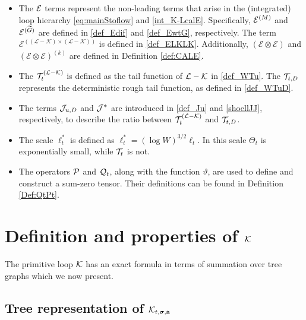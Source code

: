 \documentclass[10pt,reqno]{article}
\theoremstyle{plain} %
\theoremstyle{remark}
\numberwithin{equation}{section}
\begin{document}
\begin{itemize}
\item  The \(\cal E\) terms represent the non-leading terms that arise in the (integrated) loop hierarchy \eqref{eq:mainStoflow} and \eqref{int_K-LcalE}. Specifically, \({\cal E}^{(M)}\) and \({\cal E}^{(\widetilde{G})}\) are defined in \eqref{def_Edif} and \eqref{def_EwtG}, respectively. The term \(\mathcal{E}^{((\mathcal{L}-\mathcal{K}) \times (\mathcal{L}-\mathcal{K}))}\) is defined in \eqref{def_ELKLK}. Additionally, \(\left( \mathcal{E} \otimes \mathcal{E} \right)\) and \(\left( \mathcal{E} \otimes \mathcal{E} \right)^{(k)}\) are defined in Definition \ref{def:CALE}.

\item  The \({\cal T}^{(\cal L-\cal K)}_{t}\) is defined as the tail function of \(\cal L - \cal K\) in \eqref{def_WTu}. The \({\cal T}_{t,D}\) represents the deterministic rough tail function, as defined in \eqref{def_WTuD}. 
\item The terms \({\cal J}_{u,D}\) and \(\cal J^*\) are introduced in \eqref{def_Ju} and \eqref{shoellJJ}, respectively, to describe the ratio between \({\cal T}^{(\cal L-\cal K)}_{t}\) and \({\cal T}_{t,D}\).

\item The scale $\ell_t^*$ is defined as $\ell_t^*=(\log W)^{3/2}\ell_t$. In this scale $\Theta_t$ is exponentially small, while ${\cal T}_t$ is not. 

\item The operators \(\cal P\) and \({\cal Q}_t\), along with the function \(\vartheta\), are used to define and construct a sum-zero tensor. Their definitions can be found in Definition \ref{Def:QtPt}.
 

\end{itemize}



\section{Definition and properties of \texorpdfstring{$\cal K$}{K}}\label{Sec:CalK}

The primitive loop ${\cal K}$ has an exact formula in terms of summation over tree graphs which we now present. 

\subsection{Tree representation of \texorpdfstring{${\cal K}_{t, \boldsymbol{\sigma}, \textbf{a}}$}{K}}
\end{document}
